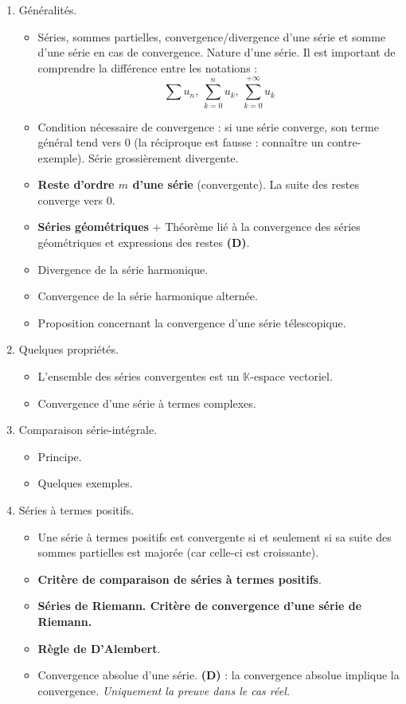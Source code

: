 \documentclass[twoside,a4paper,french,10pt]{VcCours}
\begin{document}
\begin{enumerate}
\item Généralités.
\begin{itemize}
\item Séries, sommes partielles, convergence/divergence d'une série et somme d'une série en cas de convergence.  Nature d'une série. Il est important de comprendre la différence entre les notations :
$$ \sum u_n, \,  \sum_{k=0}^n u_k, \, \sum_{k=0}^{+ \infty} u_k $$
\item Condition nécessaire de convergence : si une série converge, son terme général tend vers $0$ (la réciproque est fausse : connaître un contre-exemple). Série grossièrement divergente.
\item \textbf{Reste d'ordre $m$ d'une série} (convergente). La suite des restes converge vers $0$.
\item \textbf{Séries géométriques} + Théorème lié à la convergence des séries géométriques et expressions des restes \textbf{(D)}.
\item Divergence de la série harmonique.
\item Convergence de la série harmonique alternée.
\item Proposition concernant la convergence d'une série télescopique.
\end{itemize}
\item Quelques propriétés.
\begin{itemize}
\item L'ensemble des séries convergentes est un $\mathbb{K}$-espace vectoriel.
\item Convergence d'une série à termes complexes.
\end{itemize}
\item Comparaison série-intégrale.
\begin{itemize}
\item Principe.
\item Quelques exemples.
\end{itemize}
\item Séries à termes positifs.
\begin{itemize}
\item Une série à termes positifs est convergente si et seulement si sa suite des sommes partielles est majorée (car celle-ci est croissante).
\item \textbf{Critère de comparaison de séries à termes positifs}. 
\item \textbf{Séries de Riemann. Critère de convergence d'une série de Riemann.}
\item \textbf{Règle de D'Alembert}. 
\item Convergence absolue d'une série. \textbf{(D)} : la convergence absolue implique la convergence. \textit{Uniquement la preuve dans le cas réel.}
\end{itemize} 
\end{enumerate}
\end{document}

